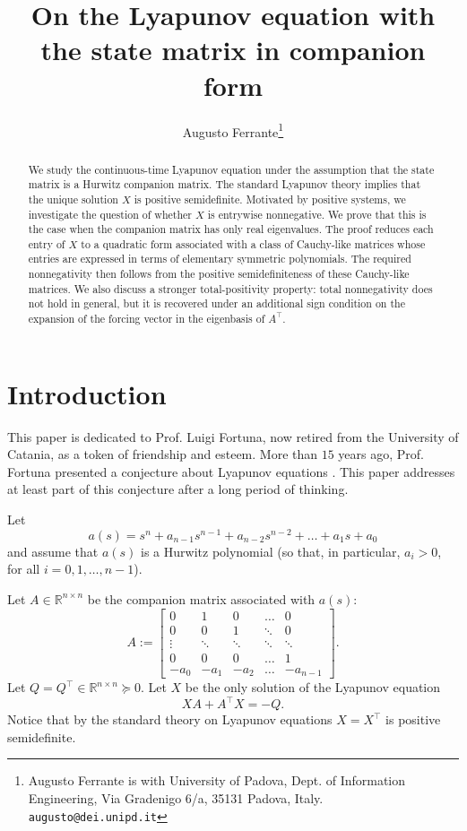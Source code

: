 \documentclass[12pt]{article}
\title{On the Lyapunov equation with the state matrix in companion form}
\author{Augusto Ferrante\thanks{Augusto Ferrante is with University of Padova, Dept. of Information Engineering, Via Gradenigo 6/a, 35131 Padova, Italy. {\tt\small augusto@dei.unipd.it}}}
\def\R{\mathbb{R}}
\newcommand{\tp}{^{\top}}
\newcommand{\beq}{\begin{equation}}
\newcommand{\eeq}{\end{equation}}
\def\bmat{\left[ \begin{array}}
\def\emat{\end{array} \right]}
\begin{document}
\maketitle

\begin{abstract}
We study the continuous-time Lyapunov equation
under the assumption that the state matrix is a Hurwitz companion matrix.  The standard
Lyapunov theory implies that the unique solution $X$ is positive
semidefinite.  Motivated by positive systems, we investigate the 
 question of whether $X$ is entrywise nonnegative.  We prove that
this is the case when the companion matrix has only real eigenvalues.  The
proof reduces each entry of $X$ to a quadratic form associated with a class of
Cauchy-like matrices whose entries are expressed in terms of elementary
symmetric polynomials.  The required nonnegativity then follows from the
positive semidefiniteness of these Cauchy-like matrices.  We also discuss a
stronger total-positivity property: total nonnegativity does not hold in
general, but it is recovered under an additional sign condition on the
expansion of the forcing vector in the eigenbasis of $A\tp$.
\end{abstract}


\section{Introduction}
This paper is dedicated to Prof. Luigi Fortuna, now retired from the University of Catania, as a token of friendship and esteem. 
More than $15$ years ago, Prof. Fortuna presented a conjecture 
about Lyapunov equations \cite{gigi-pc}. This paper addresses at least part of this conjecture
after a long period of thinking.
 

Let 
\beq\label{carpol}
a(s)=s^n+a_{n-1}s^{n-1}+a_{n-2}s^{n-2}+\dots+ a_{1}s+a_0
\eeq
and assume that $a(s)$ is a Hurwitz polynomial (so that, in particular,
$a_i>0$, for all $i=0,1,\dots, n-1$).

Let 
$A\in\R^{n\times n}$ be the companion matrix associated with $a(s)$:
\beq\label{compA}
A:=\bmat{cccccc}
0&1 &0 &\dots &0\\
0&0 &1 &\ddots &0\\
\vdots&\ddots&\ddots&\ddots&\ddots\\
0&0&0&\dots&1\\
-a_0&-a_1&-a_2&\dots&-a_{n-1}
\emat.
\eeq
Let $Q=Q\tp\in\R^{n\times n}\succeq 0.$
Let $X$ be the only solution of the Lyapunov equation
\beq\label{lyap-gen}
XA+A\tp X=-Q.
\eeq
Notice that by the standard theory on Lyapunov equations $X=X\tp$ is positive semidefinite.
\end{document}

